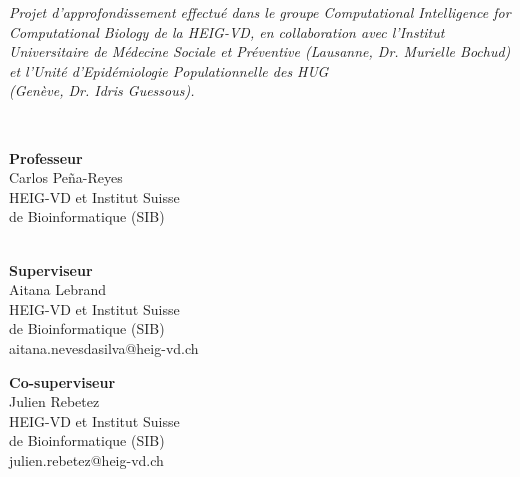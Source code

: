 \begin{titlepage}
\begin{flushleft}
\begin{flushleft}
            \textit{Projet d'approfondissement effectué dans le groupe Computational Intelligence for Computational Biology de la HEIG-VD, en collaboration avec l’Institut Universitaire de Médecine Sociale et Préventive (Lausanne, Dr. Murielle Bochud) et l’Unité d’Epidémiologie Populationnelle des HUG \\
            (Genève, Dr. Idris Guessous).}

            \vspace{0.7cm}

            {\large \textbf \@author} \\
            \@email

        \end{flushleft}

        \vspace*{\fill}

        \begin{minipage}[t]{0.49\textwidth}
            \begin{flushleft}

                \textbf{Professeur} \\
                Carlos Peña-Reyes \\
                HEIG-VD et Institut Suisse \\
                de Bioinformatique (SIB) \\
                \@professoremail \\

                \vspace{0.6cm}

                \textbf{Superviseur} \\
                Aitana Lebrand \\
                HEIG-VD et Institut Suisse \\
                de Bioinformatique (SIB) \\
                aitana.nevesdasilva@heig-vd.ch \\

                \vspace{0.6cm}

                \textbf{Co-superviseur} \\
                Julien Rebetez \\
                HEIG-VD et Institut Suisse \\
                de Bioinformatique (SIB) \\
                julien.rebetez@heig-vd.ch \\
            \end{flushleft}
         \end{minipage}
         \hfill
         \begin{minipage}[t]{0.49\textwidth}
            \begin{flushright}


\end{flushright}
\end{minipage}
\end{flushleft}
\end{titlepage}
